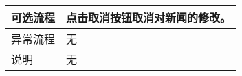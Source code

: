 \begin{table}[htbp]
\begin{tabular}{|l|l|l|l|}
        \hline
        可选流程                          & \multicolumn{3}{l|}{点击取消按钮取消对新闻的修改。 }                                                                                                                     \\
        \hline
        异常流程                          & \multicolumn{3}{l|}{无}                                                                                                                                                  \\
        \hline
        说明                              & \multicolumn{3}{l|}{无}                                                                                                                                                  \\
        \hline
    \end{tabular}
\end{table}

